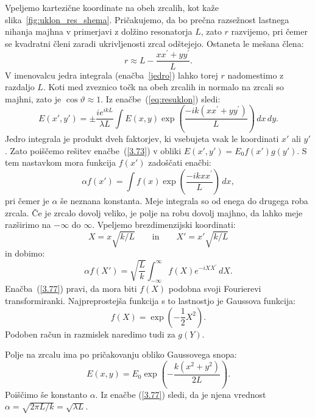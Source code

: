 Vpeljemo kartezične koordinate na obeh zrcalih, kot kaže slika~\ref{fig:uklon_res_shema}.
Pričakujemo, da bo prečna razsežnost lastnega nihanja majhna v primerjavi
z dolžino resonatorja $L$, zato $r$ razvijemo, pri čemer se kvadratni členi  
zaradi ukrivljenosti zrcal odštejejo. Ostaneta le mešana člena:
\begin{equation}
r\approx L-\frac{xx^{\prime}+yy^{\prime}}{L}.
\label{3.72}
\end{equation}
V imenovalcu jedra integrala (enačba~\ref{jedro}) lahko torej $r$ nadomestimo
z razdaljo $L$. Koti med zveznico točk na obeh zrcalih in normalo na zrcali
so majhni, zato je  $\cos\vartheta \approx 1$. 
Iz enačbe~(\ref{eq:resuklon}) sledi:
\begin{equation}
E(x',y')=\pm\frac{ie^{ikL}}{\lambda L}\int E(x,y)\exp
\left(\frac{-ik(xx^{\prime}+yy^{\prime})}{L}\right)\, dx\, dy.
\label{3.73}
\end{equation}
Jedro integrala je produkt dveh
faktorjev, ki vsebujeta vsak le koordinati $x'$ ali $y'$. Zato poiščemo
rešitev enačbe~(\ref{3.73}) v obliki  
$E(x',y')=E_{0}f(x')g(y')$.
S tem nastavkom mora funkcija $f(x')$ zadoščati enačbi:
\begin{equation}
\alpha f(x')=\int f(x)\exp\left(\frac{-ikxx^{\prime}}{L}\right)\, dx,
\label{3.75}
\end{equation}
pri čemer je $\alpha$ še neznana konstanta. Meje integrala so od enega do 
drugega roba zrcala. Če je zrcalo dovolj veliko,
je polje na robu dovolj majhno, da lahko meje razširimo
na $-\infty$ do $\infty$. Vpeljemo brezdimenzijski koordinati:
\begin{equation}
X=x\sqrt{k/L} \qquad \mathrm{in} \qquad X'=x'\sqrt{k/L}
\label{3.76}
\end{equation}
in dobimo:
\begin{equation}
\alpha f(X')=\sqrt{\frac{L}{k}}\int_{-\infty}^{\infty}f(X)e^{-iXX^{\prime}}\, dX.
\label{3.77}
\end{equation}
Enačba~(\ref{3.77}) pravi, da mora
biti $f(X)$ podobna svoji Fourierevi transformiranki. Najpreprostejša
funkcija s to lastnostjo je Gaussova funkcija:
\begin{equation}
f(X)=\exp\left(-\frac{1}{2}X^{2}\right)\!\!.
\label{3.78}
\end{equation}
Podoben račun in razmislek naredimo tudi za $g(Y)$. 

Polje na zrcalu ima po pričakovanju obliko Gaussovega snopa:
\begin{equation}
E(x,y)=E_{0}\exp\left(-\frac{k(x^{2}+y^{2})}{2L}\right)\!\!.
\label{3.79}
\end{equation}
Poiščimo še konstanto $\alpha$. Iz enačbe (\ref{3.77}) sledi, da je njena vrednost 
$\alpha = \sqrt{2\pi L/k}=\sqrt{\lambda L}$. 

